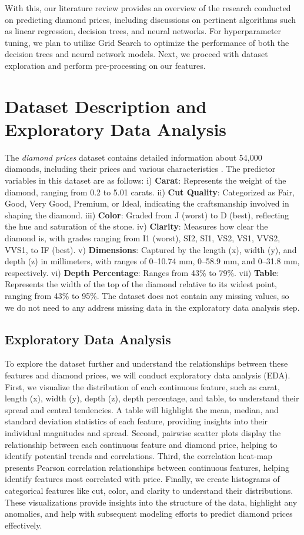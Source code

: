 \documentclass[conference]{IEEEtran}
\begin{document}
With this, our literature review provides an overview of the research conducted on predicting diamond prices, including discussions on pertinent algorithms such as linear regression, decision trees, and neural networks. For hyperparameter tuning, we plan to utilize Grid Search to optimize the performance of both the decision trees and neural network models. Next, we proceed with dataset exploration and perform pre-processing on our features.

\section{Dataset Description and Exploratory Data Analysis}

The \emph{diamond prices} dataset contains detailed information about 54,000 diamonds, including their prices and various characteristics \cite{kaggle}. The predictor variables in this dataset are as follows: i) \textbf{Carat}: Represents the weight of the diamond, ranging from 0.2 to 5.01 carats. ii) \textbf{Cut Quality}: Categorized as Fair, Good, Very Good, Premium, or Ideal, indicating the craftsmanship involved in shaping the diamond. iii) \textbf{Color}: Graded from J (worst) to D (best), reflecting the hue and saturation of the stone. iv) \textbf{Clarity}: Measures how clear the diamond is, with grades ranging from I1 (worst), SI2, SI1, VS2, VS1, VVS2, VVS1, to IF (best). v) \textbf{Dimensions}: Captured by the length (x), width (y), and depth (z) in millimeters, with ranges of 0–10.74 mm, 0–58.9 mm, and 0–31.8 mm, respectively. vi) \textbf{Depth Percentage}: Ranges from 43\% to 79\%. vii) \textbf{Table}: Represents the width of the top of the diamond relative to its widest point, ranging from 43\% to 95\%. The dataset does not contain any missing values, so we do not need to any address missing data in the exploratory data analysis step.

\subsection{Exploratory Data Analysis}

To explore the dataset further and understand the relationships between these features and diamond prices, we will conduct exploratory data analysis (EDA). First, we visualize the distribution of each continuous feature, such as carat, length (x), width (y), depth (z), depth percentage, and table, to understand their spread and central tendencies. A table will highlight the mean, median, and standard deviation statistics of each feature, providing insights into their individual magnitudes and spread. Second, pairwise scatter plots display the relationship between each continuous feature and diamond price, helping to identify potential trends and correlations. Third, the correlation heat-map presents Pearson correlation relationships between continuous features, helping identify features most correlated with price. Finally, we create histograms of categorical features like cut, color, and clarity to understand their distributions. These visualizations provide insights into the structure of the data, highlight any anomalies, and help with subsequent modeling efforts to predict diamond prices effectively.
\end{document}
